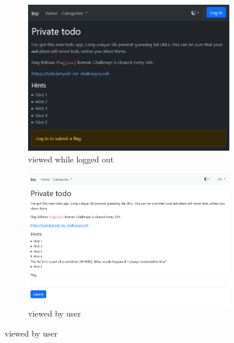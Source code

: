 \begin{figure}
    \centering
    \begin{subfigure}{0.48\textwidth}
        \includegraphics[width=\textwidth]{img/manual-task-anon.png}
        \caption{viewed while logged out}
        \label{fig:manual-task-anon}
    \end{subfigure}
    \hfill
    \begin{subfigure}{0.48\textwidth}
        \includegraphics[width=\textwidth]{img/manual-task-user.png}
        \caption{viewed by user}
        \label{fig:manual-task-user}
    \end{subfigure}


\end{figure}
